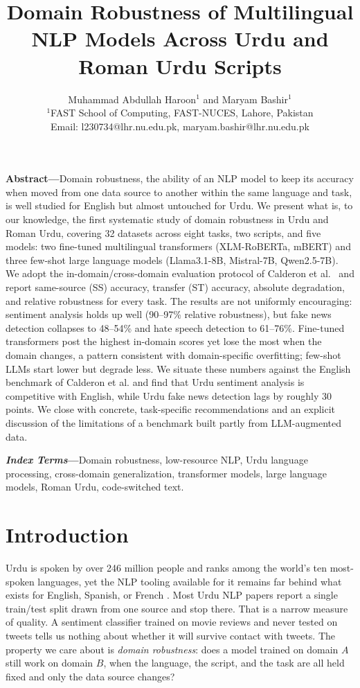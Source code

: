 \documentclass[10pt,twocolumn,journal]{IEEEtran}
\title{Domain Robustness of Multilingual NLP Models Across Urdu and Roman Urdu Scripts}
\author{Muhammad Abdullah Haroon$^{1}$ and Maryam Bashir$^{1}$\\[0.1cm]
$^{1}$FAST School of Computing, FAST-NUCES, Lahore, Pakistan\\[0.05cm]
Email: l230734@lhr.nu.edu.pk, maryam.bashir@lhr.nu.edu.pk}
\begin{document}
\maketitle

\begin{abstractbox}
\textbf{Abstract---}Domain robustness, the ability of an NLP model to keep its accuracy when moved from one data source to another within the same language and task, is well studied for English but almost untouched for Urdu. We present what is, to our knowledge, the first systematic study of domain robustness in Urdu and Roman Urdu, covering 32 datasets across eight tasks, two scripts, and five models: two fine-tuned multilingual transformers (XLM-RoBERTa, mBERT) and three few-shot large language models (Llama3.1-8B, Mistral-7B, Qwen2.5-7B). We adopt the in-domain/cross-domain evaluation protocol of Calderon et al.~\cite{calderon2024measuring} and report same-source (SS) accuracy, transfer (ST) accuracy, absolute degradation, and relative robustness for every task. The results are not uniformly encouraging: sentiment analysis holds up well (90--97\% relative robustness), but fake news detection collapses to 48--54\% and hate speech detection to 61--76\%. Fine-tuned transformers post the highest in-domain scores yet lose the most when the domain changes, a pattern consistent with domain-specific overfitting; few-shot LLMs start lower but degrade less. We situate these numbers against the English benchmark of Calderon et al. and find that Urdu sentiment analysis is competitive with English, while Urdu fake news detection lags by roughly 30 points. We close with concrete, task-specific recommendations and an explicit discussion of the limitations of a benchmark built partly from LLM-augmented data.
\end{abstractbox}

\vspace{2mm}
\textbf{\textit{Index Terms}---}Domain robustness, low-resource NLP, Urdu language processing, cross-domain generalization, transformer models, large language models, Roman Urdu, code-switched text.

\section{Introduction}

Urdu is spoken by over 246 million people and ranks among the world's ten most-spoken languages, yet the NLP tooling available for it remains far behind what exists for English, Spanish, or French \cite{devlin2019bert,conneau2020unsupervised}. Most Urdu NLP papers report a single train/test split drawn from one source and stop there. That is a narrow measure of quality. A sentiment classifier trained on movie reviews and never tested on tweets tells us nothing about whether it will survive contact with tweets. The property we care about is \emph{domain robustness}: does a model trained on domain $A$ still work on domain $B$, when the language, the script, and the task are all held fixed and only the data source changes?
\end{document}
